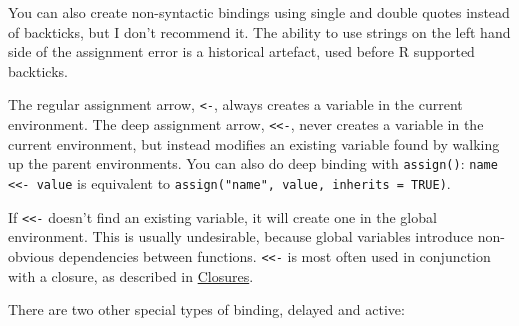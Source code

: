 \begin{shortbox}

You can also create non-syntactic bindings using single and double
quotes instead of backticks, but I don't recommend it. The ability to
use strings on the left hand side of the assignment error is a
historical artefact, used before R supported backticks.

\end{shortbox}

The regular assignment arrow, \texttt{\textless{}-}, always creates a
variable in the current environment. The deep assignment arrow,
\texttt{\textless{}\textless{}-}, never creates a variable in the
current environment, but instead modifies an existing variable found by
walking up the parent environments. You can also do deep binding with
\texttt{assign()}: \texttt{name \textless{}\textless{}- value} is
equivalent to \texttt{assign("name", value, inherits = TRUE)}.

\begin{Shaded}
\begin{Highlighting}[]
\StringTok{ }
\StringTok{ }
  \StringTok{ }
\NormalTok{\}}
\NormalTok{()}
\end{Highlighting}
\end{Shaded}

If \texttt{\textless{}\textless{}-} doesn't find an existing variable,
it will create one in the global environment. This is usually
undesirable, because global variables introduce non-obvious dependencies
between functions. \texttt{\textless{}\textless{}-} is most often used
in conjunction with a closure, as described in
\hyperref[closures]{Closures}.

There are two other special types of binding, delayed and active:

